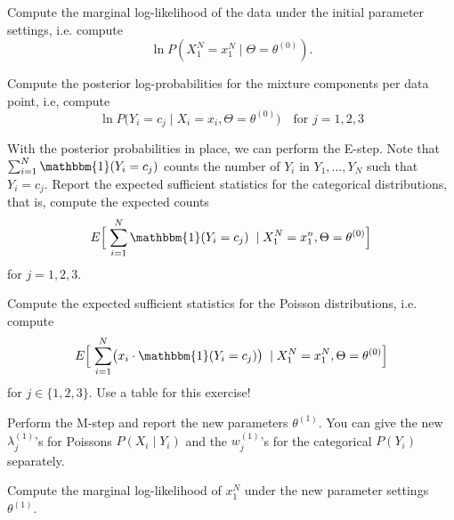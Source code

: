 \documentclass[a4paper,10pt,landscape,twocolumn]{scrartcl}
\newcommand{\Ind}[1]{\mathbbm{1}(#1)}
\begin{document}
\begin{exercise}
	
	
	\begin{subex}
		Compute the marginal log-likelihood of the data under the initial parameter settings, i.e. compute 
		\[
		\ln P(X_1^N = x_1^N \mid \Theta = \theta^{(0)}).
		\]
	\end{subex}
	
	\begin{subex}
		Compute the posterior log-probabilities for the mixture components per data point, i.e, compute
		\[
			\ln P\bigl(Y_i = c_j \mid X_i = x_i, \Theta = \theta^{(0)}\bigr) \quad \text{for $j=1,2,3$}
		\]
	\end{subex}
	
	\begin{subex}
		With the posterior probabilities in place, we can perform the E-step. Note that $\sum_{i=1}^N \Ind{Y_i = c_j}$ counts the number of $Y_i$ in $Y_1, \dots, Y_N$ such that $Y_i = c_j$. Report the expected sufficient statistics for the categorical distributions, that is, compute the expected counts
		\[
			E\Bigl[ \; \sum_{i=1}^N \Ind{Y_i = c_j} \; \mid X_1^N = x_1^n, \Theta = \theta^{(0)} \Bigr]
		\]
		for $j = 1, 2, 3$.
	\end{subex}

	\begin{subex}
	Compute the expected sufficient statistics for the Poisson distributions, i.e. compute 
	\[
		E\Bigl[\;\sum_{i=1}^N \bigl(x_i \cdot \Ind{Y_i = c_j}\bigr) \;\mid X_1^N = x_1^N, \Theta=\theta^{(0)}\Bigr]
	\] for  $j\in \{1, 2, 3\}$. Use a table for this exercise!
	\end{subex}
	
	\begin{subex}
	Perform the M-step and report the new parameters $\theta^{(1)}$. You can give the new $\lambda_j^{(1)}$'s for Poissons $P(X_i \mid Y_i)$ and the $w_j^{(1)}$'s for the categorical $ P(Y_i) $ separately.
	\end{subex}
	
	\begin{subex}
		Compute the marginal log-likelihood of $ x_1^N $ under the new parameter settings $\theta^{(1)}$. 
	\end{subex}


\end{exercise}
\end{document}
